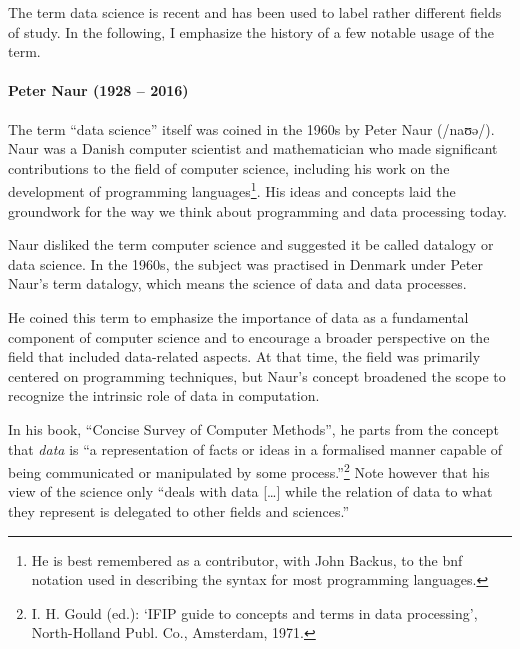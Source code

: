 The term data science is recent and has been used to label rather different fields of
study.  In the following, I emphasize the history of a few notable usage of the term.

\def\naurds{(0,0) circle (20mm)}
\def\naurcs{(0:5mm) circle (15mm)}
\def\naurde{(0:40mm) circle (15mm)}



\paragraph{Peter Naur (1928 -- 2016)}

The term ``data science'' itself was coined in the 1960s by Peter Naur (/naʊə/). Naur was
a Danish computer scientist and mathematician who made significant contributions to the
field of computer science, including his work on the development of programming
languages\footnote{He is best remembered as a contributor, with John Backus, to the
\gls{bnf} notation used in describing the syntax for most programming
languages.}.
His ideas and concepts laid the groundwork for the way we think about programming and data
processing today.

Naur disliked the term computer science and suggested it be called datalogy or data
science.  In the 1960s, the subject was practised in Denmark under Peter
Naur's term datalogy, which means the science of data and data processes.

He coined this term to emphasize the importance of data as a fundamental component of
computer science and to encourage a broader perspective on the field that included
data-related aspects. At that time, the field was primarily centered on programming
techniques, but Naur's concept broadened the scope to recognize the intrinsic role of data
in computation.

In his book, ``Concise Survey of Computer Methods'', he
parts from the concept that \emph{data} is ``a representation of facts or ideas in a
formalised manner capable of being communicated or manipulated by some
process.''\footnote{I. H. Gould (ed.): ‘IFIP guide to concepts and terms in data
processing’, North-Holland Publ. Co., Amsterdam, 1971.} Note however that his view of the
science only ``deals with data [\dots] while the relation of data to what they represent
is delegated to other fields and sciences.''

